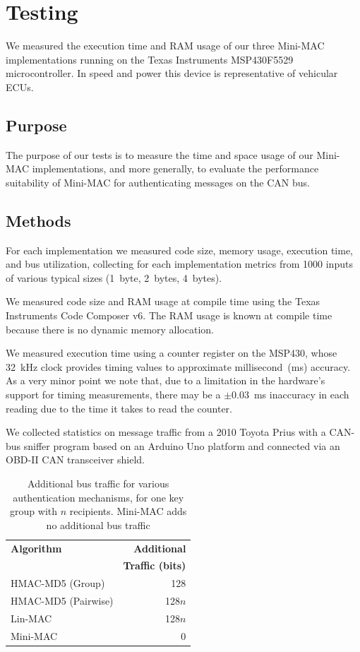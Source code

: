 \section{Testing}
\label{testing}

We measured the execution time and RAM usage of our three Mini-MAC implementations 
running on the Texas Instruments MSP430F5529 microcontroller. 
In speed and power this device is representative of vehicular ECUs.

\subsection{Purpose}
\label{purpose}

The purpose of our tests is to measure the time and space usage of our Mini-MAC implementations, and more generally,
to evaluate the performance suitability of Mini-MAC for authenticating messages on the CAN bus.

\subsection{Methods}
\label{methods}

For each implementation we measured code size, memory usage, execution time, and bus utilization,
collecting for each implementation metrics from 1000 inputs of various typical sizes (1~byte, 2~bytes, 4~bytes).  

We measured code size and RAM usage at compile time using 
the Texas Instruments Code Composer v6.
The RAM usage is known at compile time because there is no
dynamic memory allocation.

We measured execution time using a counter register on the MSP430, 
whose 32~kHz clock provides timing values to approximate millisecond~(ms) accuracy. 
As a very minor point we note that, due to a limitation in the hardware's
support for timing measurements, 
there may be a $\pm$0.03~ms inaccuracy in each reading due to the
time it takes to read the counter.

We collected statistics on message traffic from a 2010 Toyota Prius with a CAN-bus sniffer program 
based on an Arduino Uno platform and connected via an OBD-II CAN transceiver shield.
	
	\begin{table}
	\centering
	\caption{Additional bus traffic for various authentication mechanisms, 
	for one key group with $n$ recipients.  Mini-MAC adds no additional bus traffic}
	\label{tab-traffic}
	\vspace{8pt}
	\begin{tabular}{l|r}%
	\bfseries Algorithm & \bfseries Additional \\
	& {\bf Traffic (bits)} \\\hline 
	HMAC-MD5 (Group) & 128 \\
	HMAC-MD5 (Pairwise) & 128$n$ \\
	Lin-MAC & 128$n$ \\
	Mini-MAC & 0 \\
	\end{tabular}
	\end{table}


